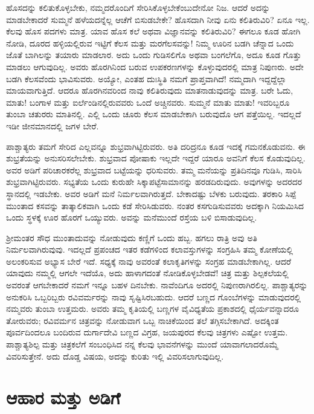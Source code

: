 ಹೊಸದನ್ನು ಕಲಿತುಕೊಳ್ಳಬೇಕು, ನಮ್ಮದರೊಂದಿಗೆ ಸೇರಿಸಿಕೊಳ್ಳಬೇಕೆಂಬುದೇನೋ ನಿಜ. ಆದರೆ ಅದನ್ನು ಮಾಡಬೇಕಾದರೆ ಸುಮ್ಮನೆ ಹಳೆಯದನ್ನೆಲ್ಲ ಆಚೆಗೆ ಬಿಸುಡಬೇಕೇ? ಹೊಸದಾಗಿ ನೀವು ಏನು ಕಲಿತಿರುವಿರಿ? ಏನೂ ಇಲ್ಲ. ಕೆಲವು ಹೊಸ ಪದಗಳು ಮಾತ್ರ. ಯಾವ ಹೊಸ ಕಲೆ ಅಥವಾ ವಿಜ್ಞಾನವನ್ನು ಕಲಿತಿರುವಿರಿ? ಈಗಲೂ ಕೂಡ ಹೋಗಿ ನೋಡಿ, ದೂರದ ಹಳ್ಳಿಯಲ್ಲಿರುವ ಇಟ್ಟಿಗೆ ಕೆಲಸ ಮತ್ತು ಮರಗೆಲಸವನ್ನು! ನಿಮ್ಮ ಊರಿನ ಬಡಗಿ ಚೆನ್ನಾದ ಒಂದು ಜೊತೆ ಬಾಗಿಲನ್ನು ತಯಾರು ಮಾಡಲಾರ. ಅದು ಒಂದು ಗುಡಿಸಲಿಗೊ ಅಥವಾ ಬಂಗಲೆಗೊ, ಅದೂ ಕೂಡ ಗೊತ್ತು ಮಾಡಲು ಆಗುವುದಿಲ್ಲ. ಅವರು ಹೊರಗಿನಿಂದ ಬರುವ ಉಪಕರಣಗಳನ್ನು ಕೊಳ್ಳುವುದರಲ್ಲಿ ಮಾತ್ರ ನಿಪುಣರು. ಅದೇ ಬಡಗಿ ಕೆಲಸವೆಂದು ಭಾವಿಸುವರು. ಅಯ್ಯೋ, ಎಂತಹ ದುಃಸ್ಥಿತಿ ನಮಗೆ ಪ್ರಾಪ್ತವಾಗಿದೆ! ನಮ್ಮದಾಗಿ ಇದ್ದದ್ದೆಲ್ಲಾ ಮಾಯವಾಗುತ್ತಿದೆ. ಆದರೂ ಹೊರಗಿನವರಿಂದ ನಾವು ಕಲಿತಿರುವುದು ಮಾತನಾಡುವುದನ್ನು ಮಾತ್ರ. ಬರೇ ಓದು, ಮಾತು! ಬಂಗಾಳ ಮತ್ತು ಐರ್ಲೆಂಡಿನಲ್ಲಿರುವವರು ಒಂದೆ ಅಚ್ಚಿನವರು. ಸುಮ್ಮನೆ ಮಾತು ಮಾತು! ಇವರಿಬ್ಬರೂ ತುಂಬಾ ಚತುರರು ಮಾತಿನಲ್ಲಿ. ಎಲ್ಲಿ ಒಂದು ಚೂರು ಕೆಲಸ ಮಾಡಬೇಕಾಗಿ ಬರುವುದೊ ಆಗ ಪತ್ತೆಯಿಲ್ಲ. ಇದಲ್ಲದೆ ಇಡೀ ಜೀನಮಾನದಲ್ಲಿ ಜಗಳ ಬೇರೆ.

ಪಾಶ್ಚಾತ್ಯರು ತಮಗೆ ಸೇರಿದ ಎಲ್ಲವನ್ನೂ ಶುಭ್ರವಾಗಿಟ್ಟಿರುವರು. ಅತಿ ದರಿದ್ರನೂ ಕೂಡ ಇದಕ್ಕೆ ಗಮನಕೊಡುವನು. ಈ ಶುಭ್ರತೆಯನ್ನು ಅನುಸರಿಸಲೇಬೇಕು. ಶುಭ್ರವಾದ ಪೋಷಾಕು ಇಲ್ಲದೇ ಇದ್ದರೆ ಯಾರೂ ಅವನಿಗೆ ಕೆಲಸ ಕೊಡುವುದಿಲ್ಲ. ಅವರ ಅಡಿಗೆ ಪರಿಚಾರಕರೆಲ್ಲ ಶುಭ್ರವಾದ ಬಟ್ಟೆಯನ್ನು ಧರಿಸುವರು. ತಮ್ಮ ಮನೆಯನ್ನು ಪ್ರತಿದಿನವೂ ಗುಡಿಸಿ, ಸಾರಿಸಿ ಶುಭ್ರವಾಗಿಟ್ಟಿರುವರು. ಸಭ್ಯತೆಯ ಒಂದು ಕುರುಹೇ ಸಿಕ್ಕಾಪಟ್ಟೆ\break ಸಾಮಾನನ್ನು ಹರಡದಿರುವುದು. ಅವುಗಳನ್ನು ಅದರದರ ಸ್ಥಾನದಲ್ಲಿ ಇಡಬೇಕು. ಅವರ ಅಡಿಗೆ ಮನೆ ನಿರ್ಮಲವಾಗಿರುತ್ತದೆ. ಬೇಕಾದಷ್ಟು ಬೆಳಕು ಬರುವುದು. ತರಕಾರಿ ಸಿಪ್ಪೆ ಮುಂತಾದ ಕಸವನ್ನು ತಾತ್ಕಾಲಿಕವಾಗಿ ಒಂದು ಕಡೆ ಸೇರಿಸಿಡುವರು. ನಂತರ ಕಸಗುಡಿಸು\break ವವರು ಅದಕ್ಕಾಗಿ ನಿಯಮಿಸಿದ ಒಂದು ಸ್ಥಳಕ್ಕೆ ಊರ ಹೊರಗೆ ಒಯ್ಯುವರು. ಅವನ್ನು ಮನೆಮುಂದೆ ರಸ್ತೆಯ ಬಳಿ ಬಿಸಾಡುವುದಿಲ್ಲ.

ಶ‍್ರೀಮಂತರ ಸೌಧ ಮುಂತಾದುವನ್ನು ನೋಡುವುದು ಕಣ್ಣಿಗೆ ಒಂದು ಹಬ್ಬ. ಹಗಲು ರಾತ್ರಿ ಅವು ಅತಿ ನಿರ್ಮಲವಾಗಿರುವುವು. ಇದಲ್ಲದೆ ಪ್ರಪಂಚದ ಇತರ ಕಡೆಗಳಿಂದ ಕಲಾವಸ್ತುಗಳನ್ನು ಸಂಗ್ರಹಿಸಿ ತಮ್ಮ ಕೋಣೆಯಲ್ಲಿ ಅಲಂಕರಿಸುವ ಅಭ್ಯಾಸ ಬೇರೆ ಇದೆ. ಸಧ್ಯಕ್ಕೆ ನಾವು ಅವರಂತೆ ಕಲಾಕೃತಿಗಳನ್ನು ಸಂಗ್ರಹ ಮಾಡಬೇಕಾಗಿಲ್ಲ. ಆದರೆ ಯಾವುದು ನಮ್ಮಲ್ಲಿ ಆಗಲೇ ಇದೆಯೊ, ಅದು ಹಾಳಾಗದಂತೆ ನೋಡಿಕೊಳ್ಳಬೇಡವೆ! ಚಿತ್ರ ಮತ್ತು ಶಿಲ್ಪಕಲೆಯಲ್ಲಿ ಅವರಂತೆ ಆಗಬೇಕಾದರೆ ನಮಗೆ ಇನ್ನೂ ಬಹಳ ದಿನಬೇಕು. ನಾವೆಂದಿಗೂ ಅದರಲ್ಲಿ ನಿಪುಣರಾಗಿರಲಿಲ್ಲ. ಪಾಶ್ಚಾತ್ಯರನ್ನು ಅನುಕರಿಸಿ ಒಬ್ಬರಿಬ್ಬರು ರವಿವರ್ಮರನ್ನು ನಾವು ಸೃಷ್ಟಿಸಿರಬಹುದು. ಆದರೆ ಬಣ್ಣದ ಗೊಂಬೆಗಳನ್ನು ಮಾಡುವುದರಲ್ಲಿ ನಮ್ಮವರು ತುಂಬಾ ಉತ್ತಮರು. ಅವರು ತಮ್ಮ ಕೃತಿಯಲ್ಲಿ ಬಣ್ಣಗಳ ವೈವಿಧ್ಯತೆಯ ಪ್ರಕಾಶದಲ್ಲಿ ಧೈರ್ಯವನ್ನಾದರೂ ತೋರುವರು; ರವಿವರ್ಮನ ಚಿತ್ರವನ್ನು ನೋಡುವಾಗ ಒಬ್ಬ ನಾಚಿಕೆ\break ಯಿಂದ ತಲೆ ತಗ್ಗಿಸಬೇಕಾಗಿದೆ. ಅದಕ್ಕಿಂತ ಪೂರ್ವದಿಂದಲೂ ಬಂದಿರುವ ದುರ್ಗಾದೇವಿ ಬಣ್ಣದ ವಿಗ್ರಹ, ಜಯಪುರದ ಕೆಲವು ಚಿತ್ರಗಳು ಎಷ್ಟೋ ಉತ್ತಮ. ಪಾಶ್ಚಾತ್ಯಶಿಲ್ಪ ಮತ್ತು ಚಿತ್ರಕಲೆಗೆ ಸಂಬಂಧಿಸಿದ ನನ್ನ ಕೆಲವು ಭಾವನೆಗಳನ್ನು ಮುಂದೆ ಯಾವಾಗಲಾದರೊಮ್ಮೆ ವಿವರಿಸುತ್ತೇನೆ. ಅದು ದೊಡ್ಡ ವಿಷಯ, ಅದನ್ನು ಕುರಿತು ಇಲ್ಲಿ ವಿವರಿಸಲಾಗುವುದಿಲ್ಲ.

\newpage

\section*{ಆಹಾರ ಮತ್ತು ಅಡಿಗೆ}

